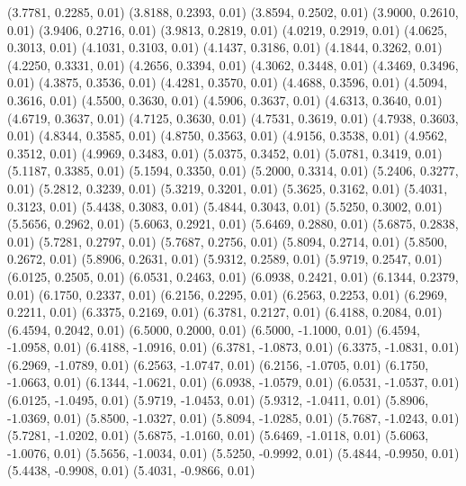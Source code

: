 {    (3.7781, 0.2285, 0.01)
    (3.8188, 0.2393, 0.01)
    (3.8594, 0.2502, 0.01)
    (3.9000, 0.2610, 0.01)
    (3.9406, 0.2716, 0.01)
    (3.9813, 0.2819, 0.01)
    (4.0219, 0.2919, 0.01)
    (4.0625, 0.3013, 0.01)
    (4.1031, 0.3103, 0.01)
    (4.1437, 0.3186, 0.01)
    (4.1844, 0.3262, 0.01)
    (4.2250, 0.3331, 0.01)
    (4.2656, 0.3394, 0.01)
    (4.3062, 0.3448, 0.01)
    (4.3469, 0.3496, 0.01)
    (4.3875, 0.3536, 0.01)
    (4.4281, 0.3570, 0.01)
    (4.4688, 0.3596, 0.01)
    (4.5094, 0.3616, 0.01)
    (4.5500, 0.3630, 0.01)
    (4.5906, 0.3637, 0.01)
    (4.6313, 0.3640, 0.01)
    (4.6719, 0.3637, 0.01)
    (4.7125, 0.3630, 0.01)
    (4.7531, 0.3619, 0.01)
    (4.7938, 0.3603, 0.01)
    (4.8344, 0.3585, 0.01)
    (4.8750, 0.3563, 0.01)
    (4.9156, 0.3538, 0.01)
    (4.9562, 0.3512, 0.01)
    (4.9969, 0.3483, 0.01)
    (5.0375, 0.3452, 0.01)
    (5.0781, 0.3419, 0.01)
    (5.1187, 0.3385, 0.01)
    (5.1594, 0.3350, 0.01)
    (5.2000, 0.3314, 0.01)
    (5.2406, 0.3277, 0.01)
    (5.2812, 0.3239, 0.01)
    (5.3219, 0.3201, 0.01)
    (5.3625, 0.3162, 0.01)
    (5.4031, 0.3123, 0.01)
    (5.4438, 0.3083, 0.01)
    (5.4844, 0.3043, 0.01)
    (5.5250, 0.3002, 0.01)
    (5.5656, 0.2962, 0.01)
    (5.6063, 0.2921, 0.01)
    (5.6469, 0.2880, 0.01)
    (5.6875, 0.2838, 0.01)
    (5.7281, 0.2797, 0.01)
    (5.7687, 0.2756, 0.01)
    (5.8094, 0.2714, 0.01)
    (5.8500, 0.2672, 0.01)
    (5.8906, 0.2631, 0.01)
    (5.9312, 0.2589, 0.01)
    (5.9719, 0.2547, 0.01)
    (6.0125, 0.2505, 0.01)
    (6.0531, 0.2463, 0.01)
    (6.0938, 0.2421, 0.01)
    (6.1344, 0.2379, 0.01)
    (6.1750, 0.2337, 0.01)
    (6.2156, 0.2295, 0.01)
    (6.2563, 0.2253, 0.01)
    (6.2969, 0.2211, 0.01)
    (6.3375, 0.2169, 0.01)
    (6.3781, 0.2127, 0.01)
    (6.4188, 0.2084, 0.01)
    (6.4594, 0.2042, 0.01)
    (6.5000, 0.2000, 0.01)
    (6.5000, -1.1000, 0.01)
    (6.4594, -1.0958, 0.01)
    (6.4188, -1.0916, 0.01)
    (6.3781, -1.0873, 0.01)
    (6.3375, -1.0831, 0.01)
    (6.2969, -1.0789, 0.01)
    (6.2563, -1.0747, 0.01)
    (6.2156, -1.0705, 0.01)
    (6.1750, -1.0663, 0.01)
    (6.1344, -1.0621, 0.01)
    (6.0938, -1.0579, 0.01)
    (6.0531, -1.0537, 0.01)
    (6.0125, -1.0495, 0.01)
    (5.9719, -1.0453, 0.01)
    (5.9312, -1.0411, 0.01)
    (5.8906, -1.0369, 0.01)
    (5.8500, -1.0327, 0.01)
    (5.8094, -1.0285, 0.01)
    (5.7687, -1.0243, 0.01)
    (5.7281, -1.0202, 0.01)
    (5.6875, -1.0160, 0.01)
    (5.6469, -1.0118, 0.01)
    (5.6063, -1.0076, 0.01)
    (5.5656, -1.0034, 0.01)
    (5.5250, -0.9992, 0.01)
    (5.4844, -0.9950, 0.01)
    (5.4438, -0.9908, 0.01)
    (5.4031, -0.9866, 0.01)
}
